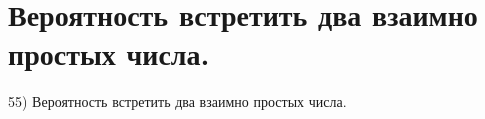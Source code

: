 \section{
 Вероятность встретить два взаимно простых числа.
}

55) Вероятность встретить два взаимно простых числа.
